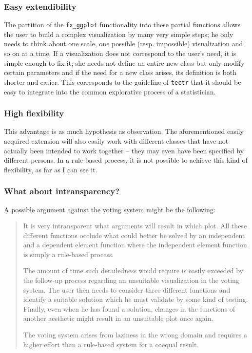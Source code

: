 \documentclass[]{report}
\theoremstyle{definition}
\theoremstyle{definition}
\theoremstyle{definition}
\theoremstyle{remark}
\begin{document}
\subsubsection{Easy extendibility}\label{easy-extendibility}

The partition of the \texttt{fx\_ggplot} functionality into these
partial functions allows the user to build a complex visualization by
many very simple steps; he only needs to think about one scale, one
possible (resp. impossible) visualization and so on at a time. If a
visualization does not correspond to the user's need, it is simple
enough to fix it; she needs not define an entire new class but only
modify certain parameters and if the need for a new class arises, its
definition is both shorter and easier. This corresponds to the guideline
of \texttt{tectr} that it should be easy to integrate into the common
explorative process of a statistician.

\subsubsection{High flexibility}\label{high-flexibility}

This advantage is as much hypothesis as observation. The aforementioned
easily acquired extension will also easily work with different classes
that have not actually been intended to work together -- they may even
have been specified by different persons. In a rule-based process, it is
not possible to achieve this kind of flexibility, as far as I can see
it.

\subsubsection{What about
intransparency?}\label{what-about-intransparency}

A possible argument against the voting system might be the following:

\begin{quote}
It is very intransparent what arguments will result in which plot. All
these different functions occlude what could better be solved by an
independent and a dependent element function where the independent
element function is simply a rule-based process.

The amount of time such detailedness would require is easily exceeded by
the follow-up process regarding an unsuitable visualization in the
voting system. The user then needs to consider three different functions
and identify a suitable solution which he must validate by some kind of
testing. Finally, even when he has found a solution, changes in the
functions of another aesthetic might result in an unsuitable plot once
again.

The voting system arises from laziness in the wrong domain and requires
a higher effort than a rule-based system for a coequal result.
\end{quote}
\end{document}
